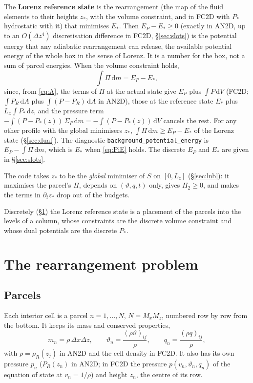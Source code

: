 \documentclass[11pt,a4paper]{article}
\newcommand{\vt}{\vartheta}
\newcommand{\code}[1]{\texttt{#1}}
\newcommand{\zs}{z_{*}}
\begin{document}
The \textbf{Lorenz reference state} is the rearrangement (the map of the fluid elements to their heights $\zs$, with the
volume constraint, and in FC2D with $P_*$ hydrostatic with it) that minimises $E_*$. Then
$E_P-E_*\ge0$ (exactly in AN2D, up to an $O(\Delta z^4)$ discretisation difference in FC2D, \S\ref{sec:slots}) is the
potential energy that any adiabatic rearrangement can release, the available potential energy of the whole box in the
sense of Lorenz. It is a number for the box, not a sum of parcel energies. When the volume constraint holds,
\begin{equation}
  \int\Pi\,\mathrm{d}m=E_P-E_* ,
  \label{eq:PiE}
\end{equation}
since, from \eqref{eq:A}, the terms of $\Pi$ at the actual state give $E_P$ plus $\int P\,\mathrm{d}V$ (FC2D; $\int P_R\,\mathrm{d}A$
plus $\int(P-P_R)\,\mathrm{d}A$ in AN2D), those at the reference state $E_*$ plus $L_x\int P_*\,\mathrm{d}z$, and the
pressure term $-\int(P-P_*(z))\,\Sigma_P\,\mathrm{d}m=-\int(P-P_*(z))\,\mathrm{d}V$ cancels the rest. For any other profile
with the global minimisers $\zs$, $\int\Pi\,\mathrm{d}m\ge E_P-E_*$ of the Lorenz state (\S\ref{sec:dual}). The diagnostic
\code{background\_potential\_energy} is $E_P-\int\Pi\,\mathrm{d}m$, which is $E_*$ when \eqref{eq:PiE} holds. The discrete
$E_P$ and $E_*$ are given in \S\ref{sec:slots}.

The code takes
$\zs$ to be the \emph{global} minimiser of $S$ on $[0,L_z]$ (\S\ref{sec:lnb}): it maximises the parcel's $\Pi$, depends on
$(\vt,q,t)$ only, gives $\Pi_2\ge0$, and makes the terms in $\partial_t\zs$ drop out of the budgets.

Discretely (\S\ref{sec:problem}) the Lorenz reference state is a placement of the parcels into the levels of a column, whose constraints are the
discrete volume constraint and whose dual potentials are the discrete $P_*$.

\section{The rearrangement problem}\label{sec:problem}
\subsection{Parcels}
Each interior cell is a parcel $n=1,\dots,N$, $N=M_xM_z$, numbered row by row from the bottom. It keeps its mass and
conserved properties,
\begin{equation}
  m_n=\rho\,\Delta x\Delta z,\qquad \vt_n=\frac{(\rho\vt)_{ij}}{\rho},\qquad q_n=\frac{(\rho q)_{ij}}{\rho},
\end{equation}
with $\rho=\rho_R(z_j)$ in AN2D and the cell density in FC2D. It also has its own pressure $p_n$ ($P_R(z_n)$ in AN2D; in FC2D
the pressure $p(v_n,\vt_n,q_n)$ of the equation of state at $v_n=1/\rho$) and height $z_n$, the centre of its row.
\end{document}
